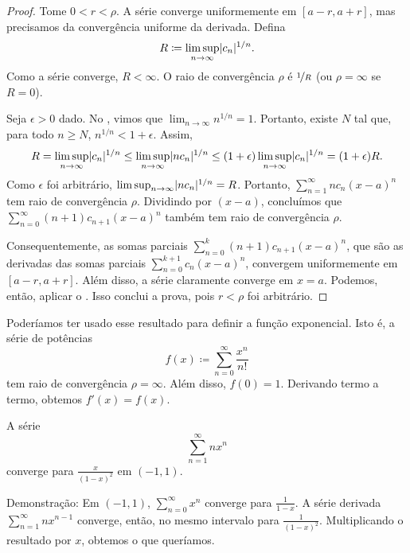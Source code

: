 \begin{proof}
Tome $0 < r < \rho$.
A série converge uniformemente em $[a-r,a+r]$, mas precisamos da
convergência uniforme da derivada.
Defina
\begin{equation*}
R \coloneqq \limsup_{n \to \infty} \lvert {c_n} \rvert^{1/n} .
\end{equation*}
Como a série converge, $R < \infty$.
O raio de convergência $\rho$ é $\nicefrac{1}{R}$ (ou $\rho = \infty$ se
$R=0$).

Seja $\epsilon > 0$ dado. No , vimos que
$\lim_{n\to\infty} n^{1/n} = 1$.
Portanto, existe $N$ tal que, para todo $n \geq N$,
$n^{1/n} < 1+\epsilon$.
Assim,
\begin{equation*}
R = 
\limsup_{n \to \infty}
\lvert {c_n} \rvert^{1/n}
\leq
\limsup_{n \to \infty}
\lvert {n c_n} \rvert^{1/n}
\leq
(1+\epsilon)
\limsup_{n \to \infty}
\lvert {c_n} \rvert^{1/n}
=
(1+\epsilon)R .
\end{equation*}
Como $\epsilon$ foi arbitrário,
$\limsup_{n \to \infty} \lvert {n c_n} \rvert^{1/n} = R$.
Portanto, $\sum_{n=1}^\infty n c_{n} {(x-a)}^{n}$ tem raio de
convergência $\rho$. Dividindo por $(x-a)$, concluímos que
$\sum_{n=0}^\infty (n+1) c_{n+1} {(x-a)}^{n}$ também tem raio de
convergência $\rho$.

Consequentemente, as somas parciais
$\sum_{n=0}^k (n+1) c_{n+1} {(x-a)}^{n}$,
que são as derivadas das somas parciais
$\sum_{n=0}^{k+1} c_{n} {(x-a)}^{n}$,
convergem uniformemente em $[a-r,a+r]$. Além disso, a série claramente
converge em $x=a$.
Podemos, então, aplicar o . Isso conclui a prova,
pois $r < \rho$ foi arbitrário.
\end{proof}

\begin{example} \label{example:exponentialbypowerseries}
Poderíamos ter usado esse resultado para definir a função exponencial. Isto
é, a série de potências
\begin{equation*}
f(x) \coloneqq \sum_{n=0}^\infty \frac{x^n}{n!}
\end{equation*}
tem raio de convergência $\rho=\infty$. Além disso, $f(0) = 1$.
Derivando termo a termo, obtemos $f'(x) = f(x)$.
\end{example}

\begin{example}
A série
\begin{equation*}
\sum_{n=1}^\infty n x^n
\end{equation*}
converge para $\frac{x}{{(1-x)}^2}$ em $(-1,1)$.

Demonstração:
Em $(-1,1)$, $\sum_{n=0}^\infty x^n$ converge para
$\frac{1}{1-x}$. A série derivada $\sum_{n=1}^\infty n x^{n-1}$ converge,
então, no mesmo intervalo para $\frac{1}{{(1-x)}^2}$. Multiplicando o
resultado por $x$, obtemos o que queríamos.
\end{example}

